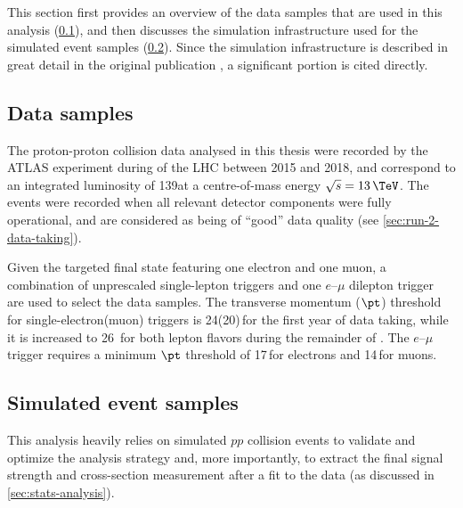 %

This section first provides an overview of the data samples that are used in this analysis (\cref{subsec:data-samples}), and then discusses the simulation infrastructure used for the simulated event samples (\cref{subsec:simulated-event-samples}).
Since the simulation infrastructure is described in great detail in the original publication , a significant portion is cited directly. 

\subsection{Data samples}
\label{subsec:data-samples}
The proton-proton collision data analysed in this thesis were recorded by the ATLAS experiment during \RunTwo of the LHC between 2015 and 2018, and correspond to an integrated luminosity of 139\ifb at a centre-of-mass energy $\sqrt{s} = 13\,\TeV$. 
The events were recorded when all relevant detector components were fully operational, and are considered as being of ``good'' data quality (see \cref{sec:run-2-data-taking}).

Given the targeted final state featuring one electron and one muon, a combination of unprescaled single-lepton triggers and one $e$--$\mu$ dilepton trigger~\cite{TRIG-2018-05,TRIG-2018-01} are used to select the data samples. 
The transverse momentum ($\pt$) threshold for single-electron(muon) triggers is 24(20)\,\GeV for the first year of data taking, while it is increased to 26~\GeV for both lepton flavors during the remainder of \RunTwo.\cite{PLACEHOLDER:FOR:PAPER}
The $e$--$\mu$ trigger requires a minimum $\pt$ threshold of 17\,\GeV for electrons and 14\,\GeV for muons.\cite{PLACEHOLDER:FOR:PAPER}


\subsection{Simulated event samples}
\label{subsec:simulated-event-samples}

This analysis heavily relies on simulated $pp$ collision events to validate and optimize the analysis strategy and, more importantly, to extract the final signal strength and cross-section measurement after a fit to the data (as discussed in \cref{sec:stats-analysis}). 

